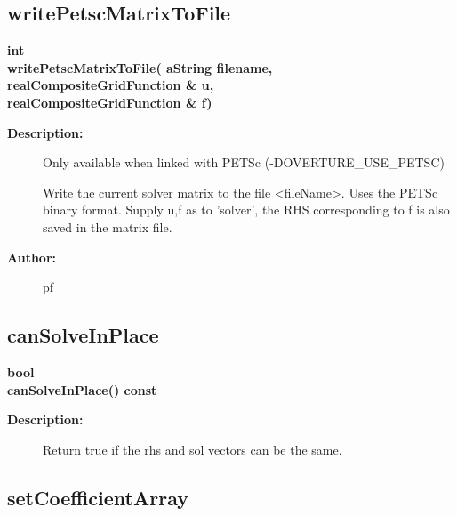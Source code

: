 \subsection{writePetscMatrixToFile}
 
\begin{flushleft} \textbf{%
int  \\ 
\settowidth{\OgesIncludeArgIndent}{writePetscMatrixToFile(}%
writePetscMatrixToFile( aString filename,\\ 
\hspace{\OgesIncludeArgIndent}realCompositeGridFunction \& u,\\ 
\hspace{\OgesIncludeArgIndent}realCompositeGridFunction \& f)
}\end{flushleft}
\begin{description}
\item[{\bf Description:}] 
    Only available when linked with PETSc (-DOVERTURE\_USE\_PETSC)

     Write the current solver matrix to the file <fileName>.
     Uses the PETSc binary format. Supply u,f as to 'solver',
     the RHS corresponding to f is also saved in the matrix file.

\item[{\bf Author:}]  pf
\end{description}
\subsection{canSolveInPlace}
 
\begin{flushleft} \textbf{%
bool  \\ 
\settowidth{\OgesIncludeArgIndent}{canSolveInPlace(}%
canSolveInPlace() const
}\end{flushleft}
\begin{description}
\item[{\bf Description:}] 
   Return true if the rhs and sol vectors can be the same.
\end{description}
\subsection{setCoefficientArray}
 
